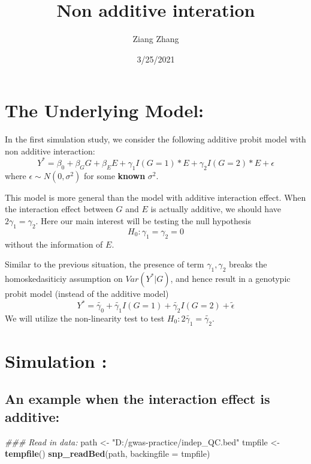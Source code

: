 \documentclass[
]{article}
\title{Non additive interation}
\author{Ziang Zhang}
\date{3/25/2021}
\newenvironment{Shaded}{\begin{snugshade}}{\end{snugshade}}
\newcommand{\CommentTok}[1]{\textcolor[rgb]{0.56,0.35,0.01}{\textit{#1}}}
\newcommand{\DataTypeTok}[1]{\textcolor[rgb]{0.13,0.29,0.53}{#1}}
\newcommand{\KeywordTok}[1]{\textcolor[rgb]{0.13,0.29,0.53}{\textbf{#1}}}
\newcommand{\NormalTok}[1]{#1}
\newcommand{\StringTok}[1]{\textcolor[rgb]{0.31,0.60,0.02}{#1}}
\begin{document}
\maketitle

{
\setcounter{tocdepth}{2}
\tableofcontents
}
\hypertarget{the-underlying-model}{%
\section{The Underlying Model:}\label{the-underlying-model}}

In the first simulation study, we consider the following additive probit
model with non additive interaction:
\[Y^* = \beta_0+\beta_GG + \beta_EE + \gamma_1I(G=1)*E+\gamma_2I(G=2)*E + \epsilon\]
where \(\epsilon\sim N(0,\sigma^2)\) for some \textbf{known}
\(\sigma^2\).

This model is more general than the model with additive interaction
effect. When the interaction effect between \(G\) and \(E\) is actually
additive, we should have \(2\gamma_1 = \gamma_2\). Here our main
interest will be testing the null hypothesis \[H_0:\gamma_1=\gamma_2=0\]
without the information of \(E\).

Similar to the previous situation, the presence of term
\(\gamma_1,\gamma_2\) breaks the homoskedasiticiy assumption on
\(Var(Y^*|G)\), and hence result in a genotypic probit model (instead of
the additive model)
\[Y^* = \tilde{\gamma_0}+ \tilde{\gamma_1}I(G=1)+\tilde{\gamma_2}I(G=2)+ \tilde{\epsilon}\]
We will utilize the non-linearity test to test
\(H_0:2\tilde{\gamma_1}= \tilde{\gamma_2}\).

\hypertarget{simulation}{%
\section{Simulation :}\label{simulation}}

\hypertarget{an-example-when-the-interaction-effect-is-additive}{%
\subsection{An example when the interaction effect is
additive:}\label{an-example-when-the-interaction-effect-is-additive}}

\begin{Shaded}
\begin{Highlighting}[]
\CommentTok{### Read in data:}
\NormalTok{path <-}\StringTok{ "D:/gwas-practice/indep_QC.bed"}
\NormalTok{tmpfile  <-}\StringTok{ }\KeywordTok{tempfile}\NormalTok{()}
\KeywordTok{snp_readBed}\NormalTok{(path, }\DataTypeTok{backingfile =}\NormalTok{ tmpfile)}
\end{Highlighting}
\end{Shaded}
\end{document}
